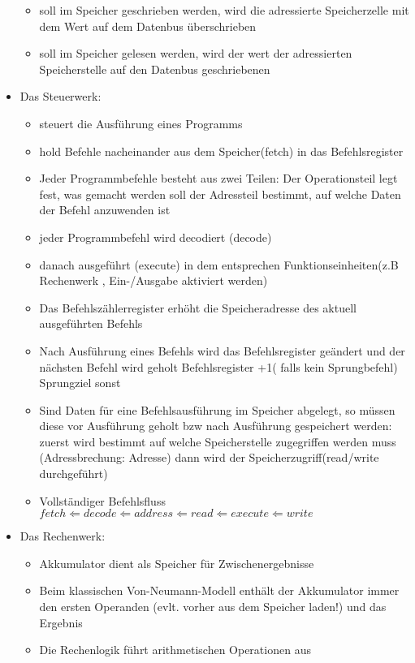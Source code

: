 \documentclass[10pt,a5paper]{article}
\begin{document}
\begin{itemize}
\begin{itemize}
\item soll im Speicher geschrieben werden, wird die adressierte Speicherzelle mit dem Wert auf dem Datenbus überschrieben
\item soll im Speicher gelesen werden, wird der wert der adressierten Speicherstelle auf den Datenbus geschriebenen
\end{itemize}
\item Das Steuerwerk:\begin{itemize}
\item steuert die Ausführung eines Programms
\item hold Befehle nacheinander aus dem Speicher(fetch) in das Befehlsregister
\item Jeder Programmbefehle besteht aus zwei Teilen:
\subitem Der Operationsteil legt fest, was gemacht werden soll
\subitem der Adressteil bestimmt, auf welche Daten der Befehl anzuwenden ist
\item jeder Programmbefehl wird decodiert (decode)
\item danach ausgeführt (execute) in dem entsprechen Funktionseinheiten(z.B Rechenwerk , Ein-/Ausgabe aktiviert werden)
\item Das Befehlszählerregister erhöht die Speicheradresse des aktuell ausgeführten Befehls
\item Nach Ausführung eines Befehls wird das Befehlsregister geändert und der nächsten Befehl wird geholt
\subitem  Befehlsregister +1( falls kein Sprungbefehl)
\subitem Sprungziel sonst
\item Sind Daten für eine Befehlsausführung im Speicher abgelegt, so müssen diese vor Ausführung geholt bzw nach Ausführung gespeichert werden:
\subitem zuerst wird bestimmt auf welche Speicherstelle zugegriffen werden muss (Adressbrechung: Adresse)
\subitem dann wird der Speicherzugriff(read/write durchgeführt)
\item Vollständiger Befehlsfluss
\subitem \ensuremath{fetch\Leftarrow decode\Leftarrow address\Leftarrow read\Leftarrow execute \Leftarrow write}
\end{itemize}
\item Das Rechenwerk:\begin{itemize}
\item Akkumulator dient als Speicher für Zwischenergebnisse
\item Beim klassischen Von-Neumann-Modell enthält der Akkumulator immer den ersten Operanden (evlt. vorher aus dem Speicher laden!) und das Ergebnis
\item Die Rechenlogik führt arithmetischen Operationen aus
\end{itemize}
\end{itemize}
\end{document}
